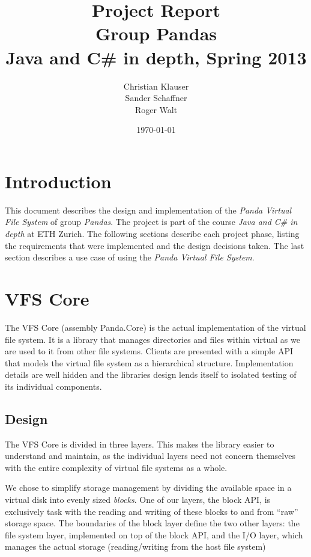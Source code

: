 \documentclass[a4paper,12pt]{article}
\title{
Project Report \\ 
Group Pandas \\
\vspace{5mm}
\large Java and C\# in depth, Spring 2013
}
\author{
Christian Klauser \\
Sander Schaffner \\
Roger Walt
}
\date{\today}
\begin{document}
\maketitle

\section{Introduction}

This document describes the design and implementation of the \emph{Panda Virtual File System} of group \emph{Pandas}. The project is part of the course \emph{Java and C\# in depth} at ETH Zurich. The following sections describe each project phase, listing the requirements that were implemented and the design decisions taken. The last section describes a use case of using the \emph{Panda Virtual File System}.


\section{VFS Core}

The VFS Core (assembly Panda.Core) is the actual implementation of the virtual file system. It is a library that manages directories and files within virtual as we are used to it from other file systems. Clients are presented with a simple API that models the virtual file system as a hierarchical structure. Implementation details are well hidden and the libraries design lends itself to isolated testing of its individual components.

\subsection{Design}


The VFS Core is divided in three layers. 
This makes the library easier to understand and maintain, as the individual layers need not concern themselves with the entire complexity of virtual file systems as a whole.

We chose to simplify storage management by dividing the available space in a virtual disk into evenly sized \emph{blocks}. 
One of our layers, the block API, is exclusively task with the reading and writing of these blocks to and from ``raw'' storage space. 
The boundaries of the block layer define the two other layers: the file system layer, implemented on top of the block API, and the I/O layer, which manages the actual storage (reading/writing from the host file system)
\end{document}
